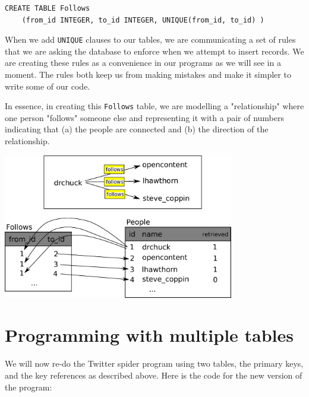 \documentclass[11pt]{book}
\begin{document}
\beforeverb
\begin{verbatim}
CREATE TABLE Follows 
    (from_id INTEGER, to_id INTEGER, UNIQUE(from_id, to_id) )
\end{verbatim}
\afterverb
%
When we add {\tt UNIQUE} clauses to our tables, we are communicating a set
of rules that we are asking the database to enforce when we attempt to insert
records.   We are creating these rules as a convenience in our programs as we
will see in a moment.  The rules both keep us from making mistakes and make
it simpler to write some of our code.

In essence, in creating this {\tt Follows} table, we are modelling a 
"relationship" where one person "follows" someone else
and representing it with a pair of numbers indicating that (a) the people are
connected and (b) the direction of the relationship.

\beforefig
\centerline{\includegraphics[height=2.50in]{figs2/twitter.eps}}
\afterfig


\section{Programming with multiple tables}

We will now re-do the Twitter spider program using two tables, the primary
keys, and the key references as described above.  Here is the code for 
the new version of the program:
\end{document}
